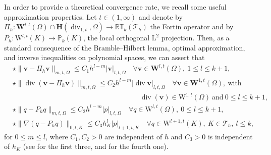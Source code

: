 \documentclass[11pt, reqno, a4paper, twoside]{article}
\newcommand{\bv}{\boldsymbol{v}}
\newcommand{\rL}{\mathrm{L}}
\newcommand{\rW}{\mathrm{W}}
\newcommand{\bH}{\mathbf{H}}
\newcommand{\bW}{\mathbf{W}}
\newcommand{\cT}{\mathcal{T}}
\newcommand\vdiv{\mathop{\mathrm{div}}\nolimits}
\numberwithin{equation}{section}
\numberwithin{remark}{section}
\numberwithin{figure}{section}
\numberwithin{table}{section}
\begin{document}
{\noindent
In order to provide a theoretical convergence rate, we recall some useful approximation properties. 
Let $t \in (1,\infty)$ and denote by  \(\Pi_h:\bW^{l,t}(\Omega)\cap\bH(\vdiv_{1,t},\Omega)\to\mathbb{RT}_k(\cT_h)\)  the Fortin operator and by \(P_h:\rW^{l,t}(K)\to \mathbb{P}_k(K)\),  the local orthogonal \(\rL^2\) projection. Then, as a standard consequence of the Bramble--Hilbert lemma, optimal approximation, and inverse inequalities on polynomial spaces, we can assert that  
\begin{subequations}
     \begin{align}
\label{eq:approx-v}        
& \star {\|\bv- \Pi_h \bv\|_{m,t,\Omega}\leq C_1 h^{l-m}|\bv|_{l,t,\Omega}\quad \forall \bv\in \mathbf{W}^{l,t}(\Omega), \ 1\leq l \leq k+1,}\\
  \label{eq:approx-div}  & \star { \|\vdiv(\bv-\Pi_h\bv)\|_{m,t,\Omega}\leq C_2h^{l-m}|\vdiv\bv|_{l,t,\Omega} \quad \forall \bv \in \mathbf{W}^{1,t}(\Omega),\ \text{with}}\\
    \nonumber           & \qquad \qquad \qquad \qquad \qquad \qquad \qquad \qquad \qquad  {\vdiv(\bv)\in \rW^{1,t}(\Omega)\ \text{and} \ 0\leq l \leq k+1,}\\
  \label{eq:approx-p}  & \star{\|q-P_hq\|_{m,t,\Omega}\leq C_2 h^{l-m}|p|_{l,t,\Omega}\quad \forall q\in \rW^{l,t}(\Omega),\ 0\leq l \leq k+1,} \\
    \label{eq:approx-p-K}  & \star {\|\nabla(q-P_hq)\|_{0,t,{K}}\leq C_3 h_K^{l}|p|_{l+1,t,K}\quad \forall q\in \rW^{l+1,t}({K}),\  K\in\mathcal{T}_h,\ l \leq k,} 
     \end{align}
     \end{subequations}
     {for $ 0\leq m\leq l$, where $C_1,C_2>0$ are  independent of \(h\) and $C_3>0$ is independent of $h_K$ 
(see \cite[Sections 4.1 and 4.5]{gatica2022p} for the first three, and \cite{ern2021finite} for the fourth  one).}

}
\end{document}
